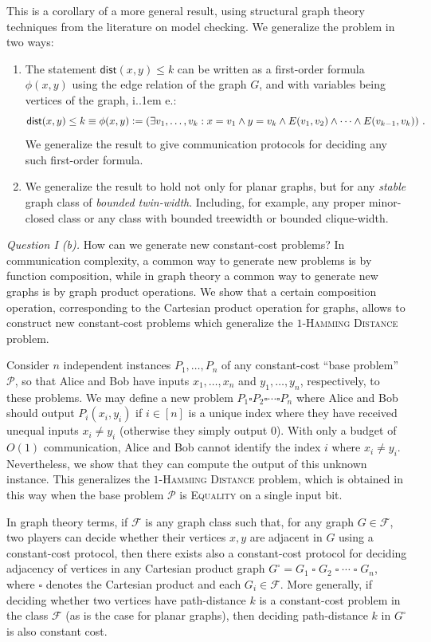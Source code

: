 \documentclass{theoretics}
\makeatletter
\newcommand{\dist}{\mathsf{dist}}
\newcommand{\define}{\vcentcolon=}
\newcommand{\cF}{\ensuremath{\mathcal{F}}}
\newcommand{\cP}{\ensuremath{\mathcal{P}}}
\newcommand*\ie{i.\kern.1em e.\@\xspace} %
\makeatother
\begin{document}
This is a corollary of a more general result, using structural graph theory techniques from the
literature on model checking. We generalize the problem in two ways:
\begin{enumerate}
\item The statement $\dist(x,y) \leq k$ can be written as a
first-order formula $\phi(x,y)$ using the edge relation of the graph $G$, and with variables being
vertices of the graph, \ie:
\[
  \dist(x,y) \leq k \equiv \phi(x,y) \define \left( \exists v_1, \dotsc, v_k : x=v_1 \wedge y = v_k
\wedge E(v_1, v_2) \wedge \dotsm \wedge E(v_{k-1}, v_k) \right) \,.
\]
We generalize the result to give communication protocols for deciding any
such first-order formula.
\item We generalize the result to hold not only for planar graphs, but for any \emph{stable} graph
class of \emph{bounded twin-width}. Including, for example, any proper minor-closed class or any
class with bounded treewidth or bounded clique-width.
\end{enumerate}

\noindent
\emph{Question I (b).}
How can we generate new constant-cost problems? In communication complexity, a common way to
generate new problems is by function composition, while in graph theory a common way to generate new
graphs is by graph product operations. We show that a certain composition operation, corresponding
to the Cartesian product operation for graphs, allows to construct new constant-cost problems 
which generalize the \textsc{$1$-Hamming Distance} problem.

Consider $n$ independent instances $P_1, \dotsc, P_n$ of any constant-cost ``base problem''
$\cP$, so that Alice and Bob have inputs $x_1, \dotsc, x_n$ and $y_1, \dotsc, y_n$, respectively, to
these problems. We may define a new problem $P_1 \square P_2 \square \dotsm \square P_n$ where Alice
and Bob should output $P_i(x_i, y_i)$ if $i \in [n]$ is a unique index where they have received
unequal inputs $x_i \neq y_i$ (otherwise they simply output 0).  With only a budget of $O(1)$
communication, Alice and Bob cannot identify the index $i$ where $x_i \neq y_i$.  Nevertheless, we
show that they can compute the output of this unknown instance. This generalizes the
\textsc{$1$-Hamming Distance} problem, which is obtained in this way when the base problem $\cP$
is \textsc{Equality} on a single input bit.

In graph theory terms, if $\cF$ is any graph class such that, for any graph $G \in \cF$, two players
can decide whether their vertices $x,y$ are adjacent in $G$ using a constant-cost protocol, then
there exists also a constant-cost protocol for deciding adjacency of vertices in any Cartesian
product graph $G^\square = G_1 \mathbin\square G_2 \mathbin\square \dotsm \mathbin\square G_n$,
where $\square$ denotes the Cartesian product and each $G_i \in \cF$. More generally, if deciding whether
two vertices have path-distance $k$ is a constant-cost problem in the class $\cF$ (as is the case
for planar graphs), then deciding path-distance $k$ in $G^\square$ is also constant cost.
\end{document}
